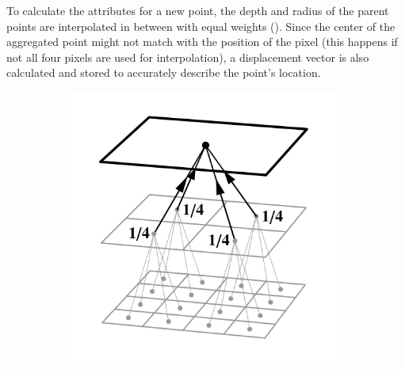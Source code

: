 To calculate the attributes for a new point, the depth and radius of the parent points are interpolated in between with equal weights (). Since the center of the aggregated point might not match with the position of the pixel (this happens if not all four pixels are used for interpolation), a displacement vector is also calculated and stored to accurately describe the point's location.

\begin{figure}[htb]
  \centering
  \begin{subfigure}[b]{0.25\textwidth}
    \centering\includegraphics[width=\textwidth]{graphics/pull_weights_marroquim1}
    \caption{\label{fig:concept:weights_marroquim1}}
  \end{subfigure}%
  \begin{subfigure}[b]{0.25\textwidth}

\end{subfigure}
\end{figure}
